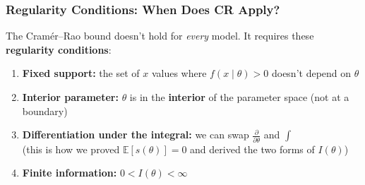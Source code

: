 \documentclass[aspectratio=169]{beamer}
\begin{document}
\begin{frame}
\frametitle{Regularity Conditions: When Does CR Apply?}

\small
The Cram\'er--Rao bound doesn't hold for \emph{every} model. It requires these \textbf{regularity conditions}:

\vspace{0.2cm}
\begin{enumerate}\setlength{\itemsep}{6pt}
  \item \textbf{Fixed support:} the set of $x$ values where $f(x \mid \theta) > 0$ doesn't depend on $\theta$
  \item \textbf{Interior parameter:} $\theta$ is in the \textbf{interior} of the parameter space (not at a boundary)
  \item \textbf{Differentiation under the integral:} we can swap $\frac{\partial}{\partial\theta}$ and $\int$ \\
    \small (this is how we proved $\mathbb{E}[s(\theta)] = 0$ and derived the two forms of $I(\theta)$)
  \item \textbf{Finite information:} $0 < I(\theta) < \infty$
\end{enumerate}

\vspace{0.3cm}
\begin{center}
\end{center}
\end{frame}
\end{document}
